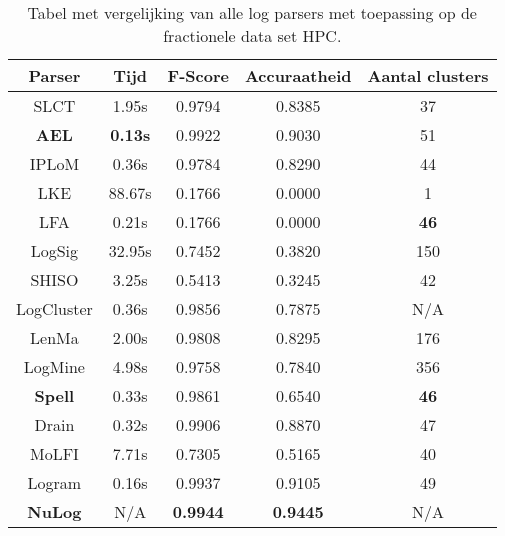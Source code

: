 \begin{table}[!htp]
    \caption{Tabel met vergelijking van alle log parsers met toepassing op de fractionele data set HPC.}
    \label{table:HPC}
    \begin{center}
        \begin{tabular}{||c | c | c | c | c||} 
            \hline
            Parser & Tijd & F-Score & Accuraatheid & Aantal clusters \\ [0.5ex] 
            \hline\hline
            SLCT & 1.95s & 0.9794 & 0.8385 & 37 \\
            
            \textbf{AEL} & \textbf{0.13s} & 0.9922 & 0.9030 & 51 \\ 
            
            IPLoM & 0.36s & 0.9784 & 0.8290 & 44 \\
            
            LKE & 88.67s & 0.1766 & 0.0000 & 1 \\
            
            LFA & 0.21s & 0.1766 & 0.0000 & \textbf{46} \\
            
            LogSig & 32.95s & 0.7452 & 0.3820 & 150 \\
            
            SHISO & 3.25s & 0.5413 & 0.3245 & 42 \\
            
            LogCluster & 0.36s & 0.9856 & 0.7875 & N/A \\
            
            LenMa & 2.00s & 0.9808 & 0.8295 & 176 \\
            
            LogMine & 4.98s & 0.9758 & 0.7840 & 356 \\
            
            \textbf{Spell} & 0.33s & 0.9861 & 0.6540 & \textbf{46} \\
            
            Drain & 0.32s & 0.9906 & 0.8870 & 47 \\
            
            MoLFI & 7.71s & 0.7305 & 0.5165 & 40 \\
            
            Logram & 0.16s & 0.9937 & 0.9105 & 49 \\
            
            \textbf{NuLog} & N/A & \textbf{0.9944} & \textbf{0.9445} & N/A \\
            \hline
        \end{tabular}
    \end{center}
\end{table}

